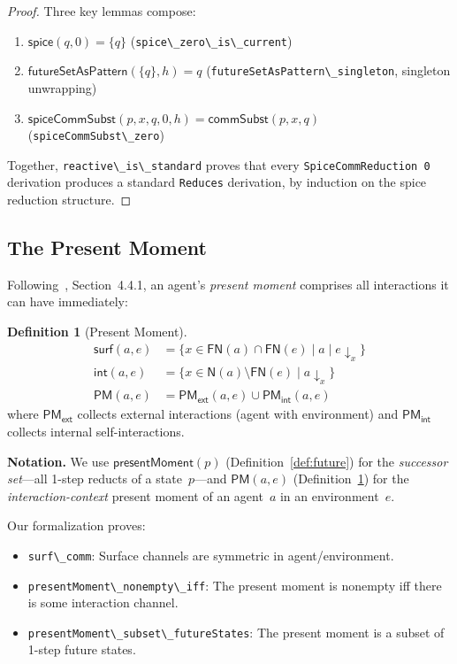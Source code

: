 \documentclass[11pt,a4paper]{article}
\theoremstyle{definition}
\newtheorem{definition}[theorem]{Definition}
\theoremstyle{remark}
\newcommand{\spiceEval}[2]{\mathsf{spice}(#1, #2)}
\newcommand{\PM}{\mathsf{PM}}
\newcommand{\surf}{\mathsf{surf}}
\newcommand{\internalC}{\mathsf{int}}
\newcommand{\FN}{\mathsf{FN}}
\newcommand{\allN}{\mathsf{N}}
\newcommand{\lean}[1]{\lstinline[language=Lean4]{#1}}
\begin{document}
\begin{proof}
Three key lemmas compose:
\begin{enumerate}[nosep]
  \item $\spiceEval{q}{0} = \{q\}$ \quad (\lean{spice\_zero\_is\_current})
  \item $\mathsf{futureSetAsPattern}(\{q\}, h) = q$ \quad
    (\lean{futureSetAsPattern\_singleton}, singleton unwrapping)
  \item $\mathsf{spiceCommSubst}(p, x, q, 0, h) = \mathsf{commSubst}(p, x, q)$ \quad
    (\lean{spiceCommSubst\_zero})
\end{enumerate}
Together, \lean{reactive\_is\_standard} proves that every
\lean{SpiceCommReduction 0} derivation produces a standard
\lean{Reduces} derivation, by induction on the spice reduction structure.
\end{proof}

\subsection{The Present Moment}
\label{sec:present}

Following~\cite{meredith2026spice}, Section~4.4.1, an agent's \emph{present
moment} comprises all interactions it can have immediately:

\begin{definition}[Present Moment]
\label{def:pm}
\begin{align*}
  \surf(a, e) &= \{ x \in \FN(a) \cap \FN(e) \mid a \mid e \downarrow_x \} \\
  \internalC(a, e) &= \{ x \in \allN(a) \setminus \FN(e) \mid a \downarrow_x \} \\
  \PM(a, e) &= \PM_{\mathsf{ext}}(a, e) \cup \PM_{\mathsf{int}}(a, e)
\end{align*}
where $\PM_{\mathsf{ext}}$ collects external interactions (agent with environment)
and $\PM_{\mathsf{int}}$ collects internal self-interactions.
\end{definition}

\noindent\textbf{Notation.}
We use $\mathsf{presentMoment}(p)$ (Definition~\ref{def:future}) for the
\emph{successor set}---all 1-step reducts of a state~$p$---and $\PM(a, e)$
(Definition~\ref{def:pm}) for the \emph{interaction-context} present moment
of an agent~$a$ in an environment~$e$.

Our formalization proves:
\begin{itemize}[nosep]
  \item \lean{surf\_comm}: Surface channels are symmetric in agent/environment.
  \item \lean{presentMoment\_nonempty\_iff}: The present moment is nonempty iff
    there is some interaction channel.
  \item \lean{presentMoment\_subset\_futureStates}: The present moment is a
    subset of 1-step future states.
\end{itemize}
\end{document}
